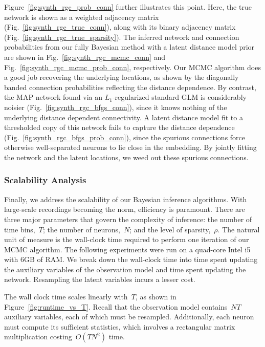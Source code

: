 Figure~\ref{fig:synth_rgc_prob_conn} further illustrates this
point. Here, the true network is shown as a weighted adjacency matrix
(Fig.~\ref{fig:synth_rgc_true_conn}), along with its binary adjacency
matrix (Fig.~\ref{fig:synth_rgc_true_sparsity}). The inferred network
and connection probabilities from our fully Bayesian method with a
latent distance model prior are shown in
Fig.~\ref{fig:synth_rgc_mcmc_conn} and
Fig.~\ref{fig:synth_rgc_mcmc_prob_conn}, respectively. Our MCMC
algorithm does a good job recovering the underlying locations, 
as shown by the diagonally banded connection probabilities reflecting the
distance dependence.  By
contrast, the MAP network found via an $L_1$-regularized standard GLM
is considerably noisier (Fig.~\ref{fig:synth_rgc_bfgs_conn}), since it
knows nothing of the underlying distance dependent connectivity. A
latent distance model fit to a thresholded copy of this network fails
to capture the distance dependence
(Fig.~\ref{fig:synth_rgc_bfgs_prob_conn}), since the spurious
connections force otherwise well-separated neurons to lie close in the
embedding. By jointly fitting the network and the latent locations, we
weed out these spurious connections.

\subsubsection{Scalability Analysis}

Finally, we address the scalability of our Bayesian inference algorithms.
With large-scale recordings becoming the norm, efficiency is paramount.
There are three major parameters that govern the complexity of inference:
the number of time bins,~$T$; the number of neurons,~$N$; and the level
of sparsity,~$\rho$. The natural unit of measure is the wall-clock time
required to perform one iteration of our MCMC algorithm. The following
experiments were run on a quad-core Intel i5 with 6GB of RAM.
We
break down the wall-clock time into time spent updating the auxiliary
variables of the observation model and time spent updating the network.
Resampling the latent variables incurs a lesser cost.

The wall clock time scales linearly with~$T$, as shown in
Figure~\ref{fig:runtime_vs_T}. Recall that the observation model
contains~${NT}$ auxiliary variables, each of which must be
resampled. Additionally, each neuron must compute its sufficient
statistics, which involves a rectangular matrix multiplication
costing~$O(TN^2)$ time.

